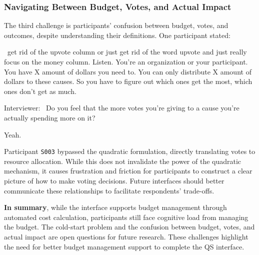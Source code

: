 
\subsubsection{Navigating Between Budget, Votes, and Actual Impact}
The third challenge is participants' confusion between budget, votes, and outcomes, despite understanding their definitions. One participant stated:

\begin{displayquote}

~\bracketellipsis get rid of the upvote column or just get rid of the word upvote and just really focus on the money column. Listen. You're an organization or your participant. You have X amount of dollars you need to. You can only distribute X amount of dollars to these causes. So you have to figure out which ones get the most, which ones don't get as much.~\bracketellipsis 

Interviewer: ~\bracketellipsis Do you feel that the more votes you're giving to a cause you're actually spending more on it?

Yeah. \hfill{}
\end{displayquote}
Participant \texttt{S003} bypassed the quadratic formulation, directly translating votes to resource allocation. While this does not invalidate the power of the quadratic mechanism, it causes frustration and friction for participants to construct a clear picture of how to make voting decisions. Future interfaces should better communicate these relationships to facilitate respondents' trade-offs.


\textbf{In summary}, while the interface supports budget management through automated cost calculation, participants still face cognitive load from managing the budget. The cold-start problem and the confusion between budget, votes, and actual impact are open questions for future research. These challenges highlight the need for better budget management support to complete the QS interface.

